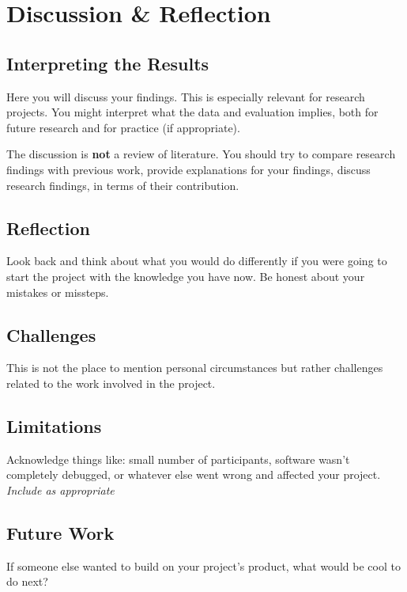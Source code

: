 \section{Discussion \& Reflection}

\subsection{Interpreting the Results}

Here you will discuss your findings. This is especially relevant for research projects. You might 
 interpret what the data and evaluation implies, both for future research and for practice (if appropriate). 
 
 The discussion is \textbf{not} a review of literature. You should try to compare research findings with previous work,
provide  explanations for your findings,
discuss  research findings, in terms of their contribution.


\subsection{Reflection}

Look back and think about what you would do differently if you were going to start the project with the knowledge you have now. Be honest about your mistakes or missteps. 

\subsection{Challenges}
This is not the place to mention personal circumstances but rather challenges related to the work involved in the project.

\subsection{Limitations}
Acknowledge things like: small number of participants, software wasn't completely debugged, or whatever else went wrong and affected your project.
\emph{Include as appropriate}



\subsection{Future Work}
If someone else wanted to build on your project's product, what would be cool to do next?
